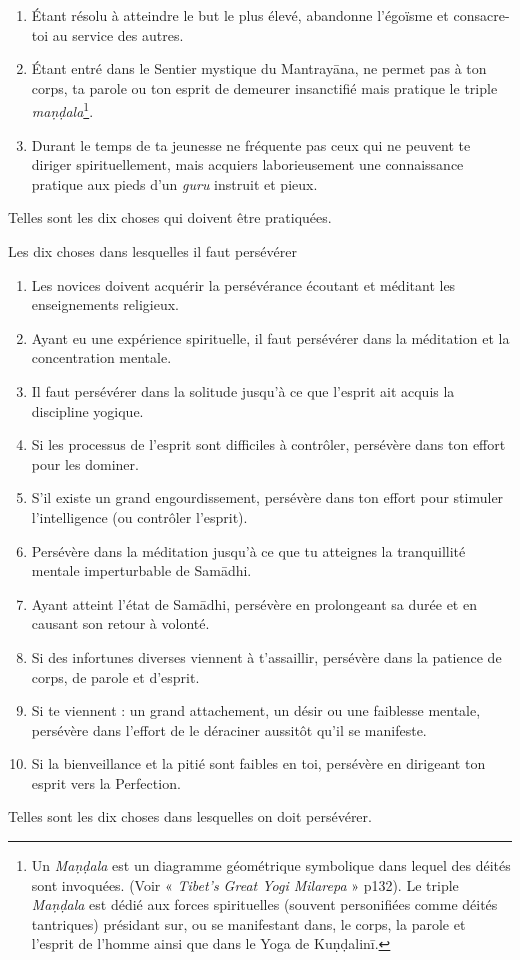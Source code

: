 \documentclass[10pt]{book}
\makeatletter
\renewcommand{\section}{\@startsection{section}{0}{0mm}
   {\baselineskip}
   {\baselineskip}{\normalfont\normalsize\scshape\centering}
}
\makeatother
\begin{document}
\begin{enumerate}[1.-]
\item Étant résolu à atteindre le but le plus élevé, abandonne l'égoïsme et consacre-toi au service des autres.
\item Étant entré dans le Sentier mystique du Mantrayāna, ne permet pas à ton corps, ta parole ou ton esprit de demeurer insanctifié mais pratique le triple \textit{maṇḍala}\footnote{Un \textit{Maṇḍala} est un diagramme géométrique symbolique dans lequel des déités sont invoquées. (Voir « \textit{Tibet's Great Yogi Milarepa} » p132). Le triple \textit{Maṇḍala} est dédié aux forces spirituelles (souvent personifiées comme déités tantriques) présidant sur, ou se manifestant dans, le corps, la parole et l'esprit de l'homme ainsi que dans le Yoga de Kuṇḍalinī.}.
\item Durant le temps de ta jeunesse ne fréquente pas ceux qui ne peuvent te diriger spirituellement, mais acquiers laborieusement une connaissance pratique aux pieds d'un \textit{guru} instruit et pieux.
\end{enumerate}
Telles sont les dix choses qui doivent être pratiquées.

\section{Les dix choses dans lesquelles il faut persévérer}
\begin{enumerate}[1.-]
\item Les novices doivent acquérir la persévérance écoutant et méditant les enseignements religieux.
\item Ayant eu une expérience spirituelle, il faut persévérer dans la méditation et la concentration mentale.
\item Il faut persévérer dans la solitude jusqu'à ce que l'esprit ait acquis la discipline yogique.
\item Si les processus de l'esprit sont difficiles à contrôler, persévère dans ton effort pour les dominer.
\item S'il existe un grand engourdissement, persévère dans ton effort pour stimuler l'intelligence (ou contrôler l'esprit).
\item Persévère dans la méditation jusqu'à ce que tu atteignes la tranquillité mentale imperturbable de Samādhi.
\item Ayant atteint l'état de Samādhi, persévère en prolongeant sa durée et en causant son retour à volonté.
\item Si des infortunes diverses viennent à t'assaillir, persévère dans la patience de corps, de parole et d'esprit.
\item Si te viennent : un grand attachement, un désir ou une faiblesse mentale, persévère dans l'effort de le déraciner aussitôt qu'il se manifeste.
\item Si la bienveillance et la pitié sont faibles en toi, persévère en dirigeant ton esprit vers la Perfection.
\end{enumerate}
Telles sont les dix choses dans lesquelles on doit persévérer.
\end{document}
